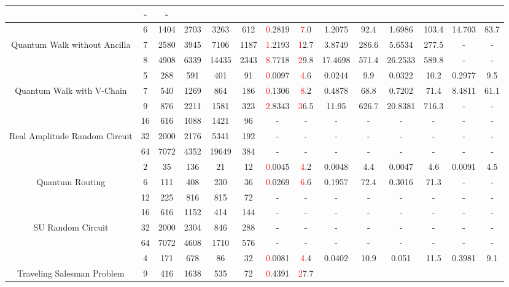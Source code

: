 \begin{table}[htb]
{\begin{tabular}{|c|c|c|c|c|c|c|c|c|c|c|c|c|c|}
 & - & -
 \\
\hline
 & 
6 & 1404 & 2703 & 3263 & 612
 & \textcolor{red}0.2819 & \textcolor{red}7.0
 & 1.2075 & 92.4
 & 1.6986 & 103.4
 & 14.703 & 83.7
 \\
Quantum Walk without Ancilla & 
7 & 2580 & 3945 & 7106 & 1187
 & \textcolor{red}1.2193 & \textcolor{red}12.7
 & 3.8749 & 286.6
 & 5.6534 & 277.5
 & - & -
 \\
 & 
8 & 4908 & 6339 & 14435 & 2343
 & \textcolor{red}8.7718 & \textcolor{red}29.8
 & 17.4698 & 571.4
 & 26.2533 & 589.8
 & - & -
 \\
\hline
 & 
5 & 288 & 591 & 401 & 91
 & \textcolor{red}0.0097 & \textcolor{red}4.6
 & 0.0244 & 9.9
 & 0.0322 & 10.2
 & 0.2977 & 9.5
 \\
Quantum Walk with V-Chain & 
7 & 540 & 1269 & 864 & 186
 & \textcolor{red}0.1306 & \textcolor{red}8.2
 & 0.4878 & 68.8
 & 0.7202 & 71.4
 & 8.4811 & 61.1
 \\
 & 
9 & 876 & 2211 & 1581 & 323
 & \textcolor{red}2.8343 & \textcolor{red}36.5
 & 11.95 & 626.7
 & 20.8381 & 716.3
 & - & -
 \\
\hline
 & 
16 & 616 & 1088 & 1421 & 96
 & - & -
 & - & -
 & - & -
 & - & -
 \\
Real Amplitude Random Circuit & 
32 & 2000 & 2176 & 5341 & 192
 & - & -
 & - & -
 & - & -
 & - & -
 \\
 & 
64 & 7072 & 4352 & 19649 & 384
 & - & -
 & - & -
 & - & -
 & - & -
 \\
\hline
 & 
2 & 35 & 136 & 21 & 12
 & \textcolor{red}0.0045 & \textcolor{red}4.2
 & 0.0048 & 4.4
 & 0.0047 & 4.6
 & 0.0091 & 4.5
 \\
Quantum Routing & 
6 & 111 & 408 & 230 & 36
 & \textcolor{red}0.0269 & \textcolor{red}6.6
 & 0.1957 & 72.4
 & 0.3016 & 71.3
 & - & -
 \\
 & 
12 & 225 & 816 & 815 & 72
 & - & -
 & - & -
 & - & -
 & - & -
 \\
\hline
 & 
16 & 616 & 1152 & 414 & 144
 & - & -
 & - & -
 & - & -
 & - & -
 \\
SU Random Circuit & 
32 & 2000 & 2304 & 846 & 288
 & - & -
 & - & -
 & - & -
 & - & -
 \\
 & 
64 & 7072 & 4608 & 1710 & 576
 & - & -
 & - & -
 & - & -
 & - & -
 \\
\hline
 & 
4 & 171 & 678 & 86 & 32
 & \textcolor{red}0.0081 & \textcolor{red}4.4
 & 0.0402 & 10.9
 & 0.051 & 11.5
 & 0.3981 & 9.1
 \\
Traveling Salesman Problem & 
9 & 416 & 1638 & 535 & 72
 & \textcolor{red}0.4391 & \textcolor{red}27.7

\end{tabular}}
\end{table}
